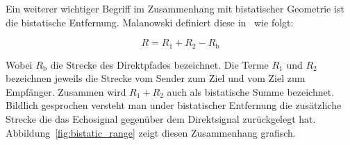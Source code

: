 Ein weiterer wichtiger Begriff im Zusammenhang mit bistatischer Geometrie ist die bistatische Entfernung. Malanowski definiert diese in~\cite[S.~10]{Malanowski2019} wie folgt:

\begin{equation}
    R = R_1 + R_2 - R_\text{b}
\end{equation}\label{eq:bistatic_range}

Wobei \(R_\text{b}\) die Strecke des Direktpfades bezeichnet. Die Terme \(R_1\) und \(R_2\) bezeichnen jeweils die Strecke vom Sender zum Ziel und vom Ziel zum Empfänger. Zusammen wird \(R_1 + R_2\) auch als bistatische Summe bezeichnet. Bildlich gesprochen versteht man under bistatischer Entfernung die zusätzliche Strecke die das Echosignal gegenüber dem Direktsignal zurückgelegt hat. Abbildung~\ref{fig:bistatic_range} zeigt diesen Zusammenhang grafisch.

